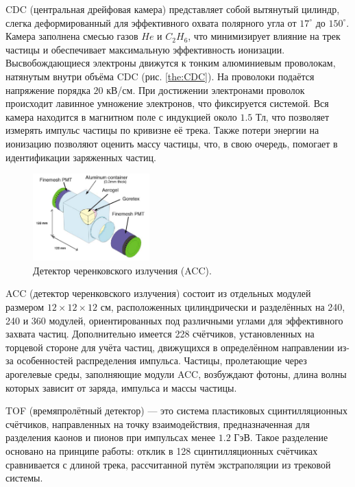 CDC (центральная дрейфовая камера) представляет собой вытянутый цилиндр, слегка деформированный для 
эффективного охвата полярного угла от $17^\circ$ до $150^\circ$. Камера заполнена смесью газов $He$ и $C_2H_6$, 
что минимизирует влияние на трек частицы и обеспечивает максимальную эффективность ионизации. 
Высвобождающиеся электроны движутся к тонким алюминиевым проволокам, натянутым внутри объёма CDC (рис. \ref{the:CDC}). 
На проволоки подаётся напряжение порядка $20$ кВ/см. При достижении электронами проволок происходит лавинное умножение электронов, 
что фиксируется системой. Вся камера находится в магнитном поле с индукцией около $1.5$ Тл, что позволяет измерять импульс 
частицы по кривизне её трека. Также потери энергии на ионизацию позволяют оценить массу частицы, что, в свою очередь, 
помогает в идентификации заряженных частиц.

\begin{figure}
    \centering
    \includegraphics[width=0.4\textwidth]{img/ACC.png}
    \caption{Детектор черенковского излучения (ACC).}
    \label{the:ACC}
\end{figure}

ACC (детектор черенковского излучения) состоит из отдельных модулей размером $12\times12\times12$ см, 
расположенных цилиндрически и разделённых на 240, 240 и 360 модулей, ориентированных под различными углами для эффективного 
захвата частиц. Дополнительно имеется 228 счётчиков, установленных на торцевой стороне для учёта частиц, движущихся в 
определённом направлении из-за особенностей распределения импульса. Частицы, пролетающие через арогелевые среды, заполняющие 
модули ACC, возбуждают фотоны, длина волны которых зависит от заряда, импульса и массы частицы.

TOF (времяпролётный детектор) — это система пластиковых сцинтилляционных счётчиков, 
направленных на точку взаимодействия, предназначенная для разделения каонов и пионов при импульсах менее $1.2$ ГэВ. 
Такое разделение основано на принципе работы: отклик в 128 сцинтилляционных счётчиках сравнивается с длиной трека, рассчитанной путём 
экстраполяции из трековой системы.


